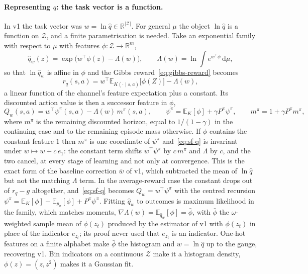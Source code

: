 \documentclass[11pt]{article}
\theoremstyle{remark}
\newcommand{\Zcal}{\mathcal Z}
\newcommand{\E}{\mathbb E}
\newcommand{\1}{\mathds{1}}
\newcommand{\dd}{\mathrm d}
\newcommand{\pz}{p_{\pi}}
\newcommand{\new}[1]{\textcolor{blue!70!black}{#1}}
\begin{document}
\paragraph{\new{Representing $q$: the task vector is a function.}}
{\color{blue!70!black}
In v1 the task vector was $w=\ln\hat q\in\mathbb R^{|\Zcal|}$.
For general $\mu$ the object $\ln\hat q$ is a function on $\Zcal$, and a finite parametrisation is needed.
Take an exponential family with respect to $\mu$ with features $\phi:\Zcal\to\mathbb R^m$,
\begin{equation}
  \hat q_w(z)=\exp\big(w^\top\phi(z)-\Lambda(w)\big),
  \qquad
  \Lambda(w)=\ln\int e^{w^\top\phi}\,\dd\mu ,
  \label{eq:expfam}
\end{equation}
so that $\ln\hat q_w$ is affine in $\phi$ and the Gibbs reward~\eqref{eq:gibbs-reward} becomes
\begin{equation}
  r_q(s,a)=w^\top\E_{K(\cdot\mid s,a)}\big[\phi(Z)\big]-\Lambda(w),
  \label{eq:expfam-reward}
\end{equation}
a linear function of the channel's feature expectation plus a constant.
Its discounted action value is then a successor feature in $\phi$,
\begin{equation}
  Q_w(s,a)=w^\top\psi^\pi(s,a)-\Lambda(w)\,m^\pi(s,a),
  \qquad
  \psi^\pi=\E_{K}[\phi]+\gamma P^\pi\psi^\pi,
  \qquad
  m^\pi=1+\gamma P^\pi m^\pi ,
  \label{eq:sf-q}
\end{equation}
where $m^\pi$ is the remaining discounted horizon, equal to $1/(1-\gamma)$ in the continuing case and to the remaining episode mass otherwise.
If $\phi$ contains the constant feature $1$ then $m^\pi$ is one coordinate of $\psi^\pi$ and~\eqref{eq:sf-q} is invariant under $w\mapsto w+c\,e_1$: the constant term shifts $w^\top\psi^\pi$ by $c\,m^\pi$ and $\Lambda$ by $c$, and the two cancel, at every stage of learning and not only at convergence.
This is the exact form of the baseline correction $\bar w$ of v1, which subtracted the mean of $\ln\hat q$ but not the matching $\Lambda$ term.
In the average-reward case the constant drops out of $r_q-g$ altogether, and~\eqref{eq:sf-q} becomes $Q_w=w^\top\psi^\pi$ with the centred recursion $\psi^\pi=\E_K[\phi]-\E_{\pz}[\phi]+P^\pi\psi^\pi$.
Fitting $\hat q_w$ to outcomes is maximum likelihood in the family, which matches moments, $\nabla\Lambda(w)=\E_{\hat q_w}[\phi]=\bar\phi$, with $\bar\phi$ the $\omega$-weighted sample mean of $\phi(z_t)$ produced by the estimator of v1 with $\phi(z_t)$ in place of the indicator $e_{z_t}$; its proof never used that $e_{z_t}$ is an indicator.
One-hot features on a finite alphabet make $\bar\phi$ the histogram and $w=\ln\hat q$ up to the gauge, recovering v1.
Bin indicators on a continuous $\Zcal$ make it a histogram density, $\phi(z)=(z,z^2)$ makes it a Gaussian fit.
}
\end{document}

